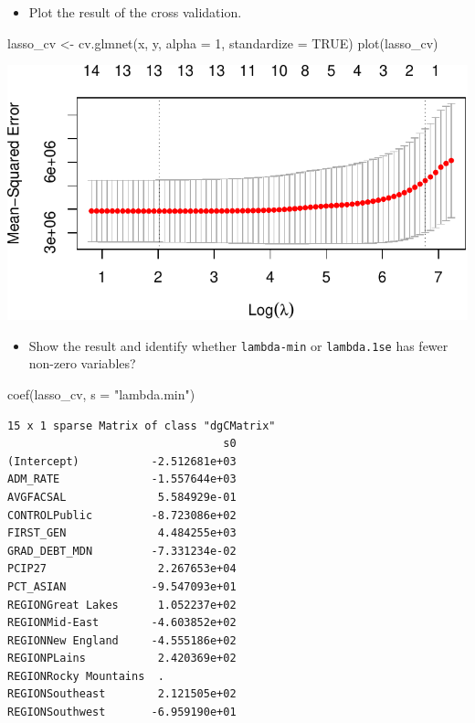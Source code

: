 \documentclass[
  letterpaper,
  DIV=11,
  numbers=noendperiod]{scrartcl}
\newenvironment{Shaded}{\begin{snugshade}}{\end{snugshade}}
\newcommand{\AttributeTok}[1]{\textcolor[rgb]{0.40,0.45,0.13}{#1}}
\newcommand{\ConstantTok}[1]{\textcolor[rgb]{0.56,0.35,0.01}{#1}}
\newcommand{\DecValTok}[1]{\textcolor[rgb]{0.68,0.00,0.00}{#1}}
\newcommand{\FunctionTok}[1]{\textcolor[rgb]{0.28,0.35,0.67}{#1}}
\newcommand{\NormalTok}[1]{\textcolor[rgb]{0.00,0.23,0.31}{#1}}
\newcommand{\OtherTok}[1]{\textcolor[rgb]{0.00,0.23,0.31}{#1}}
\newcommand{\StringTok}[1]{\textcolor[rgb]{0.13,0.47,0.30}{#1}}
\providecommand{\tightlist}{%
  \setlength{\itemsep}{0pt}\setlength{\parskip}{0pt}}\usepackage{longtable,booktabs,array}
\begin{document}
\begin{itemize}
\tightlist
\item
  Plot the result of the cross validation.
\end{itemize}

\begin{Shaded}
\begin{Highlighting}[]
\NormalTok{lasso\_cv }\OtherTok{\textless{}{-}} \FunctionTok{cv.glmnet}\NormalTok{(x, y, }\AttributeTok{alpha =} \DecValTok{1}\NormalTok{, }\AttributeTok{standardize =} \ConstantTok{TRUE}\NormalTok{)}
\FunctionTok{plot}\NormalTok{(lasso\_cv)}
\end{Highlighting}
\end{Shaded}

\includegraphics{Final_627_Tshiani_files/figure-pdf/unnamed-chunk-10-1.pdf}

\begin{itemize}
\tightlist
\item
  Show the result and identify whether \texttt{lambda-min} or
  \texttt{lambda.1se} has fewer non-zero variables?
\end{itemize}

\begin{Shaded}
\begin{Highlighting}[]
\FunctionTok{coef}\NormalTok{(lasso\_cv, }\AttributeTok{s =} \StringTok{"lambda.min"}\NormalTok{)}
\end{Highlighting}
\end{Shaded}

\begin{verbatim}
15 x 1 sparse Matrix of class "dgCMatrix"
                                 s0
(Intercept)           -2.512681e+03
ADM_RATE              -1.557644e+03
AVGFACSAL              5.584929e-01
CONTROLPublic         -8.723086e+02
FIRST_GEN              4.484255e+03
GRAD_DEBT_MDN         -7.331234e-02
PCIP27                 2.267653e+04
PCT_ASIAN             -9.547093e+01
REGIONGreat Lakes      1.052237e+02
REGIONMid-East        -4.603852e+02
REGIONNew England     -4.555186e+02
REGIONPLains           2.420369e+02
REGIONRocky Mountains  .           
REGIONSoutheast        2.121505e+02
REGIONSouthwest       -6.959190e+01
\end{verbatim}
\end{document}
